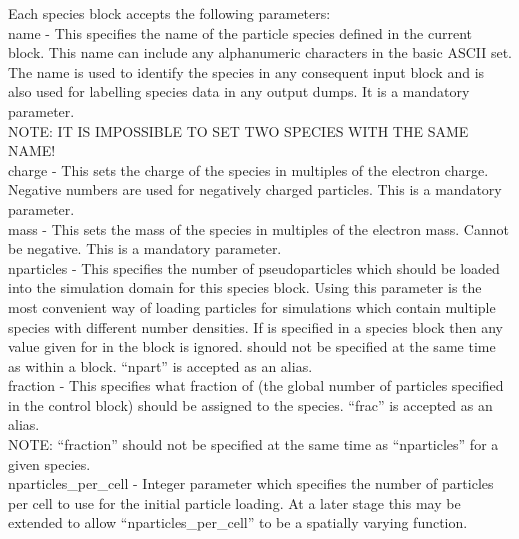 Each species block accepts the following parameters:\\

{\emphtext name} - This specifies the name of the particle species defined
in the current block. This name can include any alphanumeric characters in
the basic ASCII set. The name is used to identify the species in any
consequent input block and is also used for labelling species data in any
output dumps. It is a mandatory parameter.\\

{\emphtext NOTE: IT IS IMPOSSIBLE TO SET TWO SPECIES WITH THE SAME NAME!} \\

{\emphtext charge} - This sets the charge of the species in
multiples of the electron charge. Negative numbers are used for negatively
charged particles. This is a mandatory parameter.\\

{\emphtext mass} - This sets the mass of the species in multiples
of the electron mass. Cannot be negative. This is a mandatory parameter.\\

{\emphtext nparticles} - This specifies the number of pseudoparticles
which should be loaded into the simulation domain for this species block.
Using this parameter is the most convenient way of loading particles for
simulations which contain multiple species with different number densities.
If  is specified in a species block then any value
given for  in the  block is ignored.
 should not be specified at the same time
as  within a  block.
``npart'' is accepted as an alias.\\

{\emphtext fraction} - This specifies what fraction of 
(the global number of particles specified in the control block) should be
assigned to the species. ``frac'' is accepted as an alias.\\

{\emphtext NOTE: ``fraction'' should not be specified at the same time as
``nparticles'' for a given species.}\\

{\emphtext nparticles\_per\_cell} - Integer parameter which specifies
the number of particles per cell to use for the initial particle loading.
At a later stage this may be extended to allow ``nparticles\_per\_cell'' to be
a spatially varying function.

